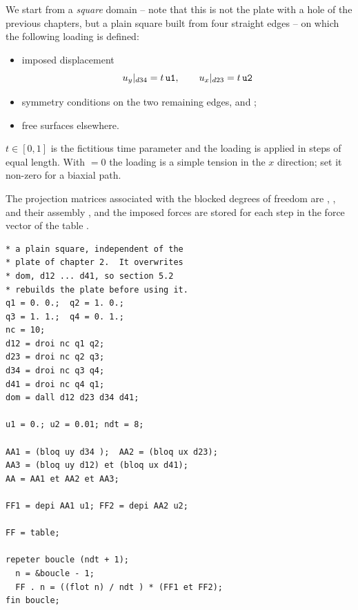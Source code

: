 \begin{castemcom}
We start from a \emph{square} domain  -- note that this is not the
plate with a hole of the previous chapters, but a plain square built from
four straight edges -- on which the following loading is defined:

\begin{itemize}
\item imposed displacement
  \[ u_y |_{d34} = t\,\texttt{u1}, \qquad u_x |_{d23} = t\,\texttt{u2} \]
\item symmetry conditions on the two remaining edges,  and
  ;
\item free surfaces elsewhere.
\end{itemize}

\noindent $t\in[0,1]$ is the fictitious time parameter and the loading is
applied in  steps of equal length. With ${}=0$ the loading is
a simple tension in the $x$ direction; set it non-zero for a biaxial path.

The projection matrices associated with the blocked degrees of freedom are
, ,  and their assembly , and the imposed
forces are stored for each step  in the force vector  of
the table .
\end{castemcom}
\begin{castemlines}
\begin{verbatim}
* a plain square, independent of the
* plate of chapter 2.  It overwrites
* dom, d12 ... d41, so section 5.2
* rebuilds the plate before using it.
q1 = 0. 0.;  q2 = 1. 0.;
q3 = 1. 1.;  q4 = 0. 1.;
nc = 10;
d12 = droi nc q1 q2;
d23 = droi nc q2 q3;
d34 = droi nc q3 q4;
d41 = droi nc q4 q1;
dom = dall d12 d23 d34 d41;

u1 = 0.; u2 = 0.01; ndt = 8;

AA1 = (bloq uy d34 );  AA2 = (bloq ux d23);
AA3 = (bloq uy d12) et (bloq ux d41);
AA = AA1 et AA2 et AA3;

FF1 = depi AA1 u1; FF2 = depi AA2 u2;

FF = table;
  
repeter boucle (ndt + 1);
  n = &boucle - 1;  
  FF . n = ((flot n) / ndt ) * (FF1 et FF2);
fin boucle;

\end{verbatim}
\end{castemlines}
 
